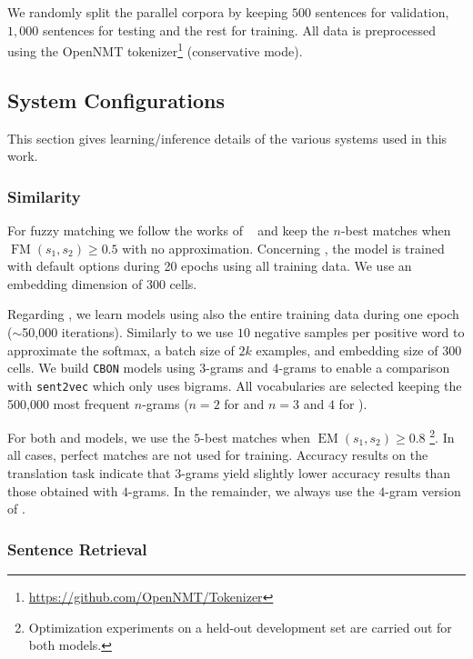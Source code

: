 We randomly split the parallel corpora by keeping $500$ sentences for validation, $1,000$ sentences for testing and the rest for training.
All data is preprocessed using the OpenNMT tokenizer\footnote{\url{https://github.com/OpenNMT/Tokenizer}} (conservative mode). 

\subsection{System Configurations}
\label{ssec:config-chap8}

This section gives learning/inference details of the various systems used in this work.

\subsubsection*{Similarity} 

For fuzzy matching  we follow the works of ~\citet{Koehn10convergence,bulte19neural,xu20boosting} and keep the $n$-best matches when $\operatorname{FM}(s_1,s_2) \geq 0.5$ with no approximation.
%
Concerning , the model is trained with default options during 20 epochs using all training data. We use an embedding dimension of 300 cells. 

Regarding , we learn models using also the entire training data during one epoch ($\sim$50,000 iterations). Similarly to  we use $10$ negative samples per positive word to approximate the softmax, a batch size of $2k$ examples, and embedding size of 300 cells. 
%
We build \texttt{CBON} models using $3$-grams and $4$-grams to enable a comparison with \texttt{sent2vec} which only uses bigrams.
All vocabularies are selected keeping the 500,000 most frequent $n$-grams ($n=2$ for  and $n=3$ and $4$ for ).

For both  and  models, we use the $5$-best matches when $\operatorname{EM}(s_1,s_2) \geq 0.8$ \footnote{Optimization experiments on a held-out development set are carried out for both models.}. 
In all cases, perfect matches are not used for training.
%
Accuracy results on the translation task indicate that $3$-grams yield slightly lower accuracy results than those obtained with $4$-grams. In the remainder, we always use the $4$-gram version of .

\subsubsection*{Sentence Retrieval}

